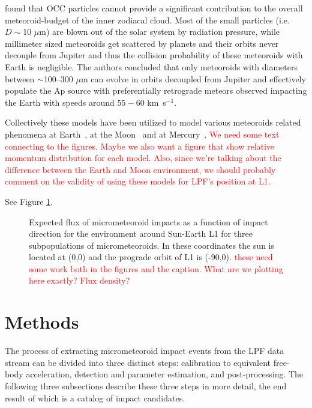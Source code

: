 \documentclass[twocolumn, trackchanges]{aastex61}
\newcommand{\red}[1]{\textcolor{red}{#1}}
\begin{document}
\cite{Nesvorny11b} found that OCC particles cannot provide a significant contribution to the overall meteoroid-budget of the inner zodiacal cloud. Most of the small particles (i.e. $D\sim$10 $\mu$m) are blown out of the solar system by radiation pressure, while millimeter sized meteoroids get scattered by planets and their orbits never decouple from Jupiter and thus the collision probability of these meteoroids with Earth is negligible. 
The authors concluded that only meteoroids with diameters between $\sim$100--300 $\mu$m can evolve in orbits decoupled from Jupiter and effectively populate the Ap source with preferentially retrograde meteors observed impacting the Earth with speeds around $55-60$ km~s$^{-1}$.

Collectively these models have been utilized to model various meteoroids related phenomena at Earth~\cite[][]{CarrilloSanchez16, Janches17}, at the Moon~\cite{Janches18} and at Mercury~\cite{Pokorny17,Pokorny18}.  \red{We need some text connecting to the figures. Maybe we also want a figure that show relative momentum distribution for each model.  Also, since we're talking about the difference between the Earth and Moon environment, we should probably comment on the validity of using these models for LPF's position at L1.}

See Figure \ref{fig:models}.

\begin{figure}
\caption{Expected flux of micrometeoroid impacts as a function of impact direction for the environment around Sun-Earth L1 for three subpopulations of micrometeoroids. In these coordinates the sun is located at (0,0) and the prograde orbit of L1 is (-90,0). \red{these need some work both in the figures and the caption.  What  are we plotting here exactly? Flux density?}
\label{fig:models}}
\end{figure}

\FloatBarrier
\section{Methods} \label{sec:methods}
The process of extracting micrometeoroid impact events from the LPF data stream can be divided into three distinct steps: calibration to equivalent free-body acceleration, detection and parameter estimation, and post-processing.  The following three subsections describe these three steps in more detail, the end result of which is a catalog of impact candidates.
\end{document}

